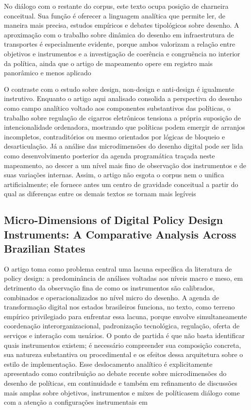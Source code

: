 \documentclass[12pt,a4paper]{article}
\begin{document}
No diálogo com o restante do corpus, este texto ocupa posição de charneira conceitual. Sua função é oferecer a linguagem analítica que permite ler, de maneira mais precisa, estudos empíricos e debates tipológicos sobre desenho. A aproximação com o trabalho sobre dinâmica do desenho em infraestrutura de transportes é especialmente evidente, porque ambos valorizam a relação entre objetivos e instrumentos e a investigação de coerência e congruência no interior da política, ainda que o artigo de mapeamento opere em registro mais panorâmico e menos aplicado \parencite{lima2021_conectando_problemas,geet2019_policy_design}

O contraste com o estudo sobre design, non-design e anti-design é igualmente instrutivo. Enquanto o artigo aqui analisado consolida a perspectiva do desenho como campo analítico voltado aos componentes substantivos das políticas, o trabalho sobre regulação de cigarros eletrônicos tensiona a própria suposição de intencionalidade ordenadora, mostrando que políticas podem emergir de arranjos incompletos, contraditórios ou mesmo orientados por lógicas de bloqueio e desarticulação. Já a análise das microdimensões do desenho digital pode ser lida como desenvolvimento posterior da agenda programática traçada neste mapeamento, ao descer a um nível mais fino de observação dos instrumentos e de suas variações internas. Assim, o artigo não esgota o corpus nem o unifica artificialmente; ele fornece antes um centro de gravidade conceitual a partir do qual as diferenças entre os demais textos se tornam mais legíveis \parencite{lima2021_conectando_problemas,newman2020_policy_design,lui2026_micro_dimensions}



\subsection{Micro-Dimensions of Digital Policy Design Instruments: A Comparative Analysis Across Brazilian States}
\label{sec:orgb8a2711}

O artigo toma como problema central uma lacuna específica da literatura de policy design: a predominância de análises voltadas aos níveis macro e meso, em detrimento da observação fina de como os instrumentos são calibrados, combinados e operacionalizados no nível micro do desenho. A agenda de transformação digital nos estados brasileiros funciona, no texto, como terreno empírico privilegiado para enfrentar essa lacuna, porque envolve simultaneamente coordenação interorganizacional, padronização tecnológica, regulação, oferta de serviços e interação com usuários. O ponto de partida é que não basta identificar quais instrumentos existem; é necessário compreender sua composição concreta, sua natureza substantiva ou procedimental e os efeitos dessa arquitetura sobre o estilo de implementação. Esse deslocamento analítico é explicitamente apresentado como contribuição ao debate recente sobre microdimensões do desenho de políticas, em continuidade e também em refinamento de discussões mais amplas sobre objetivos, instrumentos e mixes de políticas\parencite{lui2026_micro_dimensions}em diálogo com\parencite{lima2021_conectando_problemas}e com a atenção a configurações instrumentais em\parencite{newman2020_policy_design}
\end{document}
